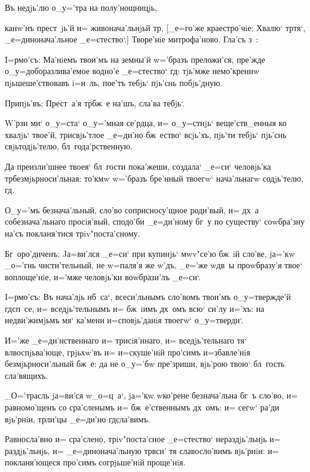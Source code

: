 Въ недjь'лю о_у='тра на полу'нощницjь,

канw'нъ прест~jь'й и= живонача'льнjьй тр, 
[_е=го'же краестро'чiе: Хвалю` тр тя`, 
_е=динонача'льное _е=стество`.] Творе'нiе митрофа'ново. 
Гла'съ з~:


I=рмо'съ: Ма'нiемъ твои'мъ на земны'й w='бразъ 
преложи'ся, пре'жде о_у=доборазлива'емое водно'е 
_е=стество` гд: тjь'мже немо'креннw пjьшеше'ствовавъ 
i=и~ль, пое'тъ тебjь` пjь'снь побjь'дную.

Припjь'въ: Прест~а'я тр бж~е на'шъ, сла'ва тебjь`.

W'рзи ми` о_у=ста` о_у='мная се'рдца, и= 
о_у=стнjь` веще'ств_енныя ко хвалjь` твое'й, трисвjь'тлое 
_е=ди'но бж~ество` всjь'хъ, пjь'ти тебjь` пjь'снь 
свjьтодjь'телю, бл~года'рственную.

Да преизли'шнее твоея` бл~гости пока'жеши, создала` 
_е=си` человjь'ка тр безмjьрноси'льная: то'кмw 
w='бразъ бре'нный твоегw` нача'льнагw содjь'телю, 
гд.

О_у='мъ безнача'льный, сло'во соприсносу'щное 
роди'вый, и= дх~а собезнача'льнаго просiя'вый, сподо'би 
_е=ди'ному бг~у по существу` соwбра'зну на'съ 
покланя'тися трiv"поста'сному.

Бг~оро'диченъ: Jа=ви'лся _е=си` при купинjь` мwv"се'ю 
бж~iй сло'ве, jа='кw _о='гнь чисти'тельный, не w=паля'я 
же w'дъ, _е='же w\т дв~ы проwбразу'я твое` 
воплоще'нiе, и='мже человjь'ки воwбрази'лъ _е=си`.


I=рмо'съ: Въ нача'лjь нб~са`, всеси'льнымъ сло'вомъ 
твои'мъ о_у=твержде'й гд сп~се, и= вседjь'тельнымъ и= 
бж~iимъ дх~омъ всю` си'лу и='хъ: на недви'жимjьмъ мя` 
ка'мени и=сповjь'данiя твоегw` о_у=тверди`.

И='же _е=ди'нственнаго и= трисiя'ннаго, и= 
вседjь'тельнаго тя` вл воспjьва'юще, грjьхw'въ и= 
и=скуше'нiй про'симъ и=збавле'нiя безмjьрноси'льный бж~е: 
да не о_у='бw пре'зриши, вjь'рою твою` бл~гость 
сла'вящихъ.

_О='трасль jа=ви'ся w\т _о=ц~а`, jа='кw w\т ко'рене 
безнача'льна бг~ъ сло'во, и= равномо'щенъ со сра'сленымъ 
и= бж~е'ственнымъ дх~омъ: и= сегw` ра'ди вjь'рнiи, 
тр ли'цы _е=ди'но гд сла'вимъ.

Равносла'вно и= сра'слено, трiv"поста'сное _е=стество` 
нераздjь'льнjь и= раздjь'льнjь, и= _е=динонача'льную 
тр вси' тя славосло'вимъ вjь'рнiи: и= покланя'ющеся 
про'симъ согрjьше'нiй проще'нiя.

